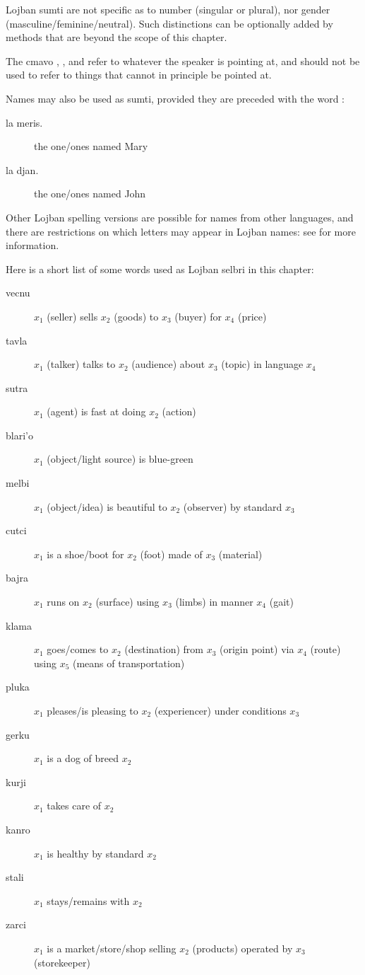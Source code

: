 Lojban sumti are not specific as to number (singular or plural), nor gender (masculine/feminine/neutral). Such distinctions can be optionally added by methods that are beyond the scope of this chapter.

The cmavo , , and  refer to whatever the speaker is pointing at, and should not be used to refer to things that cannot in principle be pointed at.

Names may also be used as sumti, provided they are preceded with the word :
\begin{description}
\item[la meris.] the one/ones named Mary
\item[la djan.] the one/ones named John
\end{description}

Other Lojban spelling versions are possible for names from other languages, and there are restrictions on which letters may appear in Lojban names: see  for more information.



Here is a short list of some words used as Lojban selbri in this chapter: 
\begin{description}
\item[vecnu] $x_1$ (seller) sells $x_2$ (goods) to $x_3$ (buyer) for $x_4$ (price)
\item[tavla] $x_1$ (talker) talks to $x_2$ (audience) about $x_3$ (topic) in language $x_4$
\item[sutra] $x_1$ (agent) is fast at doing $x_2$ (action)
\item[blari'o] $x_1$ (object/light source) is blue-green
\item[melbi] $x_1$ (object/idea) is beautiful to $x_2$ (observer) by standard $x_3$
\item[cutci] $x_1$ is a shoe/boot for $x_2$ (foot) made of $x_3$ (material)
\item[bajra] $x_1$ runs on $x_2$ (surface) using $x_3$ (limbs) in manner $x_4$ (gait)
\item[klama] $x_1$ goes/comes to $x_2$ (destination) from $x_3$ (origin point) via $x_4$ (route) using $x_5$ (means of transportation)
\item[pluka] $x_1$ pleases/is pleasing to $x_2$ (experiencer) under conditions $x_3$
\item[gerku] $x_1$ is a dog of breed $x_2$
\item[kurji] $x_1$ takes care of $x_2$
\item[kanro] $x_1$ is healthy by standard $x_2$
\item[stali] $x_1$ stays/remains with $x_2$
\item[zarci] $x_1$ is a market/store/shop selling $x_2$ (products) operated by $x_3$ (storekeeper)
\end{description}

